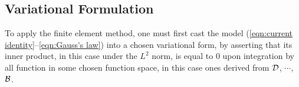 \subsection{Variational Formulation}
    
    To apply the finite element method, one must first cast the model (\ref{eqn:current identity}–\ref{eqn:Gauss's law}) into a chosen variational form, by asserting that its inner product, in this case under the $L^{2}$ norm, is equal to $0$ upon integration by all function in some chosen function space, in this case ones derived from $\mathcal{D}$, $\cdots$, $\mathcal{B}$.
    
    
    
    